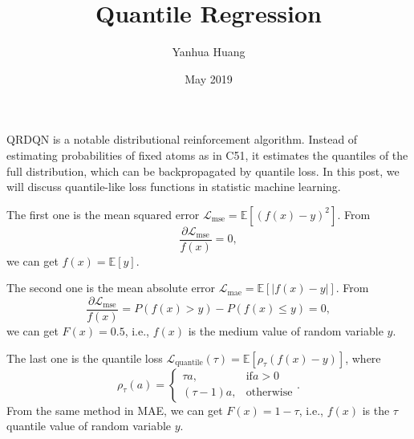 \documentclass[a4paper,11pt]{article}
\begin{document}
\title{Quantile Regression}
\author{Yanhua Huang}
\date{May 2019}
\maketitle

QRDQN is a notable distributional reinforcement algorithm. Instead of estimating probabilities of fixed atoms as in C51, it estimates the quantiles of the full distribution, which can be backpropagated by quantile loss. In this post, we will discuss quantile-like loss functions in statistic machine learning.

The first one is the mean squared error $\mathcal{L}_\mathrm{mse} = \mathbb{E}[(f(x) - y)^2]$. From 
\begin{equation}
\frac{\partial \mathcal{L}_{\mathrm{mse}}}{f(x)} = 0,
\end{equation}
we can get $f(x) = \mathbb{E}[y]$. 

The second one is the mean absolute error $\mathcal{L}_\mathrm{mae} = \mathbb{E}[|f(x) - y|]$. From 
\begin{equation}
\frac{\partial \mathcal{L}_{\mathrm{mse}}}{f(x)} = P(f(x)>y) - P(f(x) \le y) = 0,
\end{equation}
we can get $F(x) = 0.5$, i.e., $f(x)$ is the medium value of random variable $y$.

The last one is the quantile loss $\mathcal{L}_{\mathrm{quantile}}(\tau) = \mathbb{E}[\rho_\tau(f(x) - y)]$, where 
\begin{equation}
    \rho_\tau(a)= 
\begin{cases}
    \tau a,& \mathrm{if } a > 0\\
    (\tau - 1)a,& \mathrm{otherwise}
\end{cases}.
\end{equation}
From the same method in MAE, we can get $F(x) = 1 - \tau$, i.e., $f(x)$ is the $\tau$ quantile value of random variable $y$.
\end{document}

